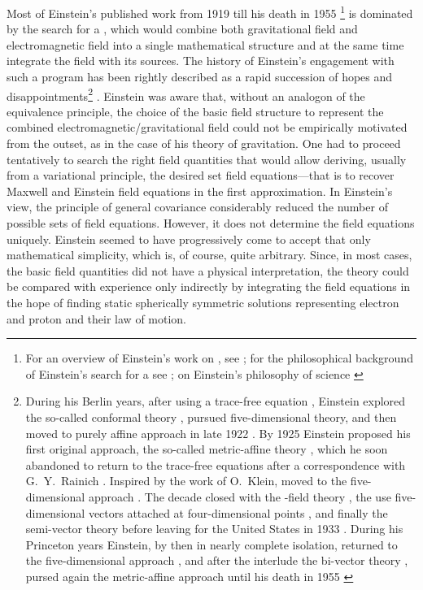 \documentclass[draft]{article}
\newcommand{\FP}{\german{Fernparallelismus}\xspace}
\begin{document}
Most of Einstein's published work from 1919 till his death in 1955 \citep{Einstein1955-07}\footnote{For an overview of Einstein's work on \uftp, see \citet{Sauer2014}; for the philosophical background of Einstein's search for a \uft see \citet{Dongen2010}; on Einstein's philosophy of science \citet{Ryckman2017}} is dominated by the search for a \uft, which would combine both gravitational field and electromagnetic field into a single mathematical structure and at the same time integrate the field with its sources. The history of Einstein's engagement with such a program has been rightly described as a rapid succession of hopes and disappointments\footnote{During his Berlin years, after using a trace-free equation \citep{Einstein1919}, Einstein explored the so-called conformal theory \citep{Einstein1921c}, pursued  five-dimensional theory, and then moved to  purely affine approach in late 1922 \citep{Einstein1923c,Einstein1923d,Einstein1923e}. By 1925 Einstein proposed his first original approach, the so-called metric-affine theory \citep{Einstein1925a}, which he soon abandoned to return to the trace-free equations after a correspondence with G.~Y.~Rainich \citep{Einstein1927c}. Inspired by the work of O.~Klein, moved to the five-dimensional approach \citep{Einstein19271,Einstein19272}. The decade closed with the \FP-field theory \citep{Einstein19281,Einstein19282,Einstein1929b,Einstein1930g}, the use five-dimensional vectors attached at four-dimensional points \cite{Einstein1931,Einstein1932}, and finally the semi-vector theory before leaving for the United States in 1933 \citep{Einstein1932c,Einstein1933c,Einstein1934b,Einstein1933d}. During his Princeton years Einstein, by then in nearly complete isolation, returned to the five-dimensional approach \citep{Einstein1938a}, and after the interlude the bi-vector theory \citep{Einstein1944a,Einstein1944}, pursed again the metric-affine approach until his death in 1955 \citep{Einstein1945,Einstein1945-04,Einstein1955-07}} \citep[187]{Vizgin1994}. Einstein was aware that, without an analogon of the equivalence principle, the choice of the basic field structure to represent the combined electromagnetic/gravitational field could not be empirically motivated from the outset, as in the case of his theory of gravitation. One had to proceed tentatively to search the right field quantities that would allow deriving, usually from a variational principle, the desired set field equations---that is to recover Maxwell and Einstein field equations in the first approximation. In Einstein's view, the principle of general covariance considerably reduced the number of possible sets of field equations. However, it does not determine the field equations uniquely. Einstein seemed to have progressively come to accept that only mathematical simplicity, which is, of course, quite arbitrary. Since, in most cases, the basic field quantities did not have a physical interpretation, the theory could be compared with experience only indirectly by integrating the field equations in the hope of finding static spherically symmetric solutions representing electron and proton and their law of motion. 
\end{document}
